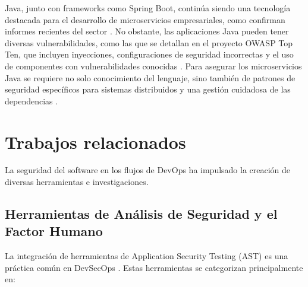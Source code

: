 Java, junto con frameworks como Spring Boot, continúa siendo una tecnología destacada para el desarrollo de microservicios empresariales, como confirman informes recientes del sector \cite{NewRelic2024JavaEcosystem}. No obstante, las aplicaciones Java pueden tener diversas vulnerabilidades, como las que se detallan en el proyecto OWASP Top Ten, que incluyen inyecciones, configuraciones de seguridad incorrectas y el uso de componentes con vulnerabilidades conocidas \cite{OWASP2021TopTen}. Para asegurar los microservicios Java se requiere no solo conocimiento del lenguaje, sino también de patrones de seguridad específicos para sistemas distribuidos y una gestión cuidadosa de las dependencias \cite{FiniteState2023JavaVulnerabilities}.

\section{Trabajos relacionados}\label{sec:trabajos_relacionados}
La seguridad del software en los flujos de DevOps ha impulsado la creación de diversas herramientas e investigaciones.

\subsection{Herramientas de Análisis de Seguridad y el Factor Humano}
La integración de herramientas de Application Security Testing (AST) es una práctica común en DevSecOps \cite{Kumar2022DevSecOpsReview}. Estas herramientas se categorizan principalmente en:

